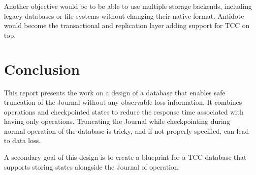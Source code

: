 \documentclass[twoside]{article}
\begin{document}
Another objective would be to be able to use multiple storage backends,
including legacy databases or file systems without changing their
native format. 
Antidote would become the transactional and replication layer adding support
for TCC on top.




\section{Conclusion}
\label{sec:conclusion}

This report presents the work on a design of a database that enables safe 
truncation of the Journal without any observable loss information. 
It combines operations and checkpointed states to reduce the response time
associated with having only operations.
Truncating the Journal while checkpointing during normal operation of the
database is tricky, and if not properly specified, can lead to data loss.

A secondary goal of this design is to create a blueprint for a TCC database that
supports storing states alongside the Journal of operation.




\tableofcontents
\end{document}
